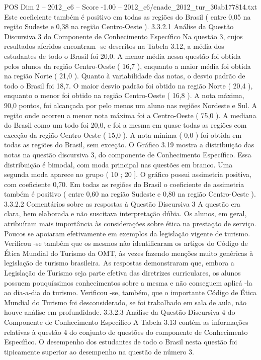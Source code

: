 \begin{textsample}{POS Dim 2 – 2012\_c6 – Score -1.00 – 2012\_c6/enade\_2012\_tur\_30ab177814.txt}
Este coeficiente também é positivo em todas as regiões do Brasil ( entre 0,05 na região Sudeste e 0,38 na região Centro-Oeste ). 3.3.2.1 Análise da Questão Discursiva 3 do Componente de Conhecimento Específico Na questão 3, cujos resultados aferidos encontram -se descritos na Tabela 3.12, a média dos estudantes de todo o Brasil foi 20,0.
A menor média nessa questão foi obtida pelos alunos da região Centro-Oeste ( 16,7 ), enquanto a maior média foi obtida na região Norte ( 21,0 ).
Quanto à variabilidade das notas, o desvio padrão de todo o Brasil foi 18,7.
O maior desvio padrão foi obtido na região Norte ( 20,4 ), enquanto o menor foi obtido na região Centro-Oeste ( 16,8 ).
A nota máxima, 90,0 pontos, foi alcançada por pelo menos um aluno nas regiões Nordeste e Sul.
A região onde ocorreu a menor nota máxima foi a Centro-Oeste ( 75,0 ).
A mediana do Brasil como um todo foi 20,0, e foi a mesma em quase todas as regiões com exceção da região Centro-Oeste ( 15,0 ).
A nota mínima ( 0,0 ) foi obtida em todas as regiões do Brasil, sem exceção.
O Gráfico 3.19 mostra a distribuição das notas na questão discursiva 3, do componente de Conhecimento Específico.
Essa distribuição é bimodal, com moda principal nas questões em branco.
Uma segunda moda aparece no grupo ( 10 ; 20 ].
O gráfico possui assimetria positiva, com coeficiente 0,70.
Em todas as regiões do Brasil o coeficiente de assimetria também é positivo ( entre 0,60 na região Sudeste e 0,80 na região Centro-Oeste ). 3.3.2.2 Comentários sobre as respostas à Questão Discursiva 3 A questão era clara, bem elaborada e não suscitava interpretação dúbia.
Os alunos, em geral, atribuíram mais importância às considerações sobre ética na prestação de serviço.
Poucos se apoiaram efetivamente em exemplos da legislação vigente de turismo.
Verificou -se também que os mesmos não identificaram os artigos do Código de Ética Mundial do Turismo da OMT, às vezes fazendo menções muito genéricas à legislação de turismo brasileira.
As respostas demonstraram que, embora a Legislação de Turismo seja parte efetiva das diretrizes curriculares, os alunos possuem pouquíssimos conhecimentos sobre a mesma e não conseguem aplicá -la ao dia-a-dia do turismo.
Verificou -se, também, que o importante Código de Ética Mundial do Turismo foi desconsiderado, se foi trabalhado em sala de aula, não houve análise em profundidade. 3.3.2.3 Análise da Questão Discursiva 4 do Componente de Conhecimento Específico A Tabela 3.13 contém as informações relativas à questão 4 do conjunto de questões do componente de Conhecimento Específico.
O desempenho dos estudantes de todo o Brasil nesta questão foi tipicamente superior ao desempenho na questão de número 3.

\end{textsample}
